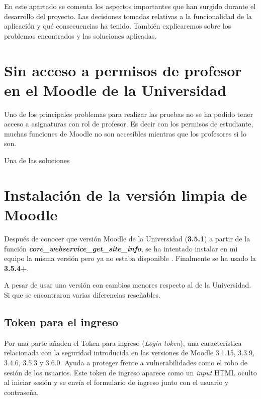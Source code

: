 
En este apartado se comenta los aspectos importantes que han surgido durante el desarrollo del proyecto. Las decisiones tomadas relativas a la funcionalidad de la aplicación y qué consecuencias ha tenido. También explicaremos sobre los problemas encontrados y las soluciones aplicadas.

\section{Sin acceso a permisos de profesor en el Moodle de la Universidad}

Uno de los principales problemas para realizar las pruebas no se ha podido tener acceso a asignaturas con rol de profesor. Es decir con los permisos de estudiante, muchas funciones de Moodle no son accesibles mientras que los profesores si lo son.

Una de las soluciones 

\section{Instalación de la versión limpia de Moodle}
Después de conocer que versión Moodle de la Universidad (\textbf{3.5.1}) a partir de la función \textbf{\textit{core\_webservice\_get\_site\_info}}, se ha intentado instalar en mi equipo la misma versión pero ya no estaba disponible \cite{noauthor_moodle_nodate}. Finalmente se ha usado la \textbf{3.5.4+}.

A pesar de usar una versión con cambios menores respecto al de la Universidad. Si que se encontraron varias diferencias reseñables. 

\subsection{Token para el ingreso}
Por una parte añaden el Token para ingreso\cite{noauthor_token_nodate} (\textit{Login token}), una característica relacionada con la seguridad introducida en las versiones de Moodle 3.1.15, 3.3.9, 3.4.6, 3.5.3 y 3.6.0. Ayuda a proteger frente a vulnerabilidades como el robo de sesión de los usuarios. Este token de ingreso aparece como un \textit{input} HTML oculto al iniciar sesión y se envía el formulario de ingreso junto con el usuario y contraseña.




